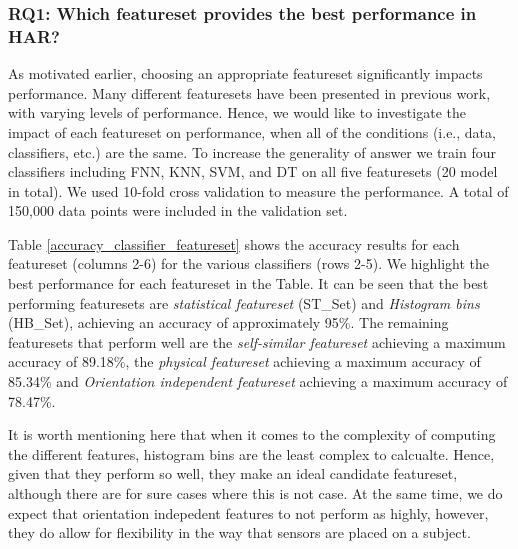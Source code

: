 \documentclass[journal,article,submit,moreauthors,pdftex]{Definitions/mdpi}
\begin{document}
\subsubsection{RQ1: Which featureset provides the best performance in HAR?}

As motivated earlier, choosing an appropriate featureset significantly impacts performance. Many different featuresets have been presented in previous work, with varying levels of performance. Hence, we would like to investigate the impact of each featureset on performance, when all of the conditions (i.e., data, classifiers, etc.) are the same. To increase the generality of answer we train four classifiers including FNN, KNN, SVM, and DT on all five featuresets (20 model in total). We used 10-fold cross validation to measure the performance. A total of 150,000 data points were included in the validation set. 

Table \ref{accuracy_classifier_featureset} shows the accuracy results for each featureset (columns 2-6) for the various classifiers (rows 2-5). We highlight the best performance for each featureset in the Table. It can be seen that the best performing featuresets are \textit{statistical featureset} (ST\_Set) and \textit{Histogram bins} (HB\_Set), achieving an accuracy of approximately 95\%. The remaining featuresets that perform well are the \textit{self-similar featureset} achieving a maximum accuracy of 89.18\%, the \textit{physical featureset} achieving a maximum accuracy of 85.34\% and \textit{Orientation independent featureset} achieving a maximum accuracy of 78.47\%.

It is worth mentioning here that when it comes to the complexity of computing the different features, histogram bins are the least complex to calcualte. Hence, given that they perform so well, they make an ideal candidate featureset, although there are for sure cases where this is not case. At the same time, we do expect that orientation indepedent features to not perform as highly, however, they do allow for flexibility in the way that sensors are placed on a subject.
\end{document}
